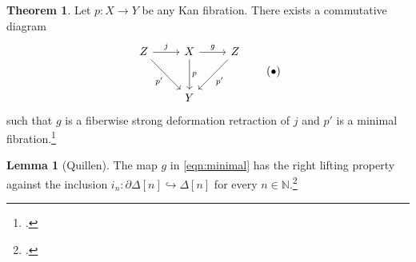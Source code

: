 \documentclass[10pt,letterpaper,cm]{nupset}
\theoremstyle{definition}
\theoremstyle{theorem}
\newtheorem{theorem}[definition]{Theorem}
\newtheorem{lemma}[definition]{Lemma}
\theoremstyle{remark}
\newcommand{\0}{\mathbf{0}}
\newcommand{\1}{\mathbf{1}}
\newcommand{\2}{\mathbf{2}}
\newcommand{\N}{\mathbb N}
\begin{document}
\begin{theorem}\label{minfact}
Let  $p: X \to Y$ be any Kan fibration. There exists a commutative diagram
\[ \label{eqn:minimal}
\begin{tikzcd}[row sep=large]
Z \arrow[rd, "p'"'] \arrow[r, "j"] & X \arrow[r, "g"] \arrow[d, "p"] & Z \arrow[ld, "p'"] \\
                                   & Y                               &                   
\end{tikzcd}
\tag{$\bullet$}
\] such that $g$ is a fiberwise strong deformation retraction of $j$ and $p'$ is a minimal fibration.\footnote{\cite[Theorem 3.3.3]{Joyal}.}
\end{theorem}


\begin{lemma}[Quillen]\label{Quillen}
The map $g$ in \eqref{eqn:minimal} has the right lifting property against the inclusion $i_n: \partial{\Delta[n]} \hookrightarrow \Delta[n]$ for every $n\in \N$.\footnote{\cite[Lemma 10.11]{goerss}.}
\end{lemma}
\end{document}
